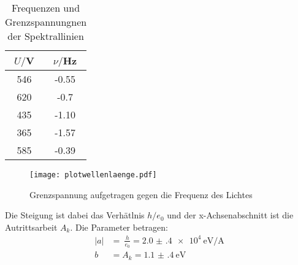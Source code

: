 \begin{table}[H]
  \centering
  \caption{Frequenzen und Grenzspannungnen der Spektrallinien}
  \label{tab:Spannungsamplitude}
  \begin{tabular}{c c}
    \toprule
    $U/$V & $\nu/$Hz \\
    \midrule
    546 &     -0.55 \\
    620 &     -0.7 \\
    435 &     -1.10 \\
    365 &     -1.57 \\
    585 &     -0.39 \\
    \bottomrule
  \end{tabular}
\end{table}



\begin{figure}[H]
  \centering
  \texttt{[image: plotwellenlaenge.pdf]}
  \caption{Grenzspannung aufgetragen gegen die Frequenz des Lichtes}
  \label{fig:plotorange}
\end{figure}



Die Steigung ist dabei das Verhätlnis $h/e_0$ und der x-Achsenabschnitt ist die Autrittsarbeit $A_k$.
Die Parameter betragen:
\begin{align*}
  |a| &=\ \frac{h}{e_0}= \SI{2.0(4)e4}{\eV\per\ampere} \\
  b &= A_k = \SI{1.1(4)}{\eV}
\end{align*}
